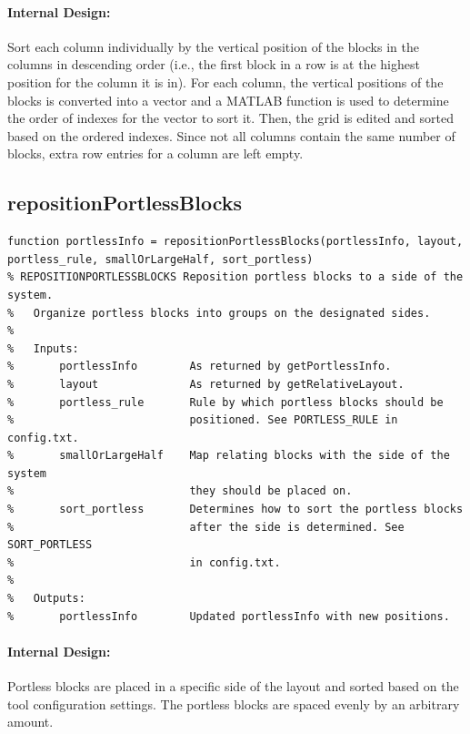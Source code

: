 \documentclass[12pt,letterpaper]{report}
\begin{document}
\paragraph{Internal Design:} Sort each column individually by the vertical position of the blocks in the columns in descending order (i.e., the first block in a row is at the highest position for the column it is in). For each column, the vertical positions of the blocks is converted into a vector and a MATLAB function is used to determine the order of indexes for the vector to sort it. Then, the grid is edited and sorted based on the ordered indexes. Since not all columns contain the same number of blocks, extra row entries for a column are left empty.

\subsection{repositionPortlessBlocks}
\begin{lstlisting}
function portlessInfo = repositionPortlessBlocks(portlessInfo, layout, portless_rule, smallOrLargeHalf, sort_portless)
% REPOSITIONPORTLESSBLOCKS Reposition portless blocks to a side of the system.
%   Organize portless blocks into groups on the designated sides.
%
%   Inputs:
%       portlessInfo        As returned by getPortlessInfo.
%       layout              As returned by getRelativeLayout.
%       portless_rule       Rule by which portless blocks should be
%                           positioned. See PORTLESS_RULE in config.txt.
%       smallOrLargeHalf    Map relating blocks with the side of the system
%                           they should be placed on.
%       sort_portless       Determines how to sort the portless blocks
%                           after the side is determined. See SORT_PORTLESS
%                           in config.txt.
%
%   Outputs:
%       portlessInfo        Updated portlessInfo with new positions.
\end{lstlisting}
\paragraph{Internal Design:} Portless blocks are placed in a specific side of the layout and sorted based on the tool configuration settings. The portless blocks are spaced evenly by an arbitrary amount.
\end{document}
